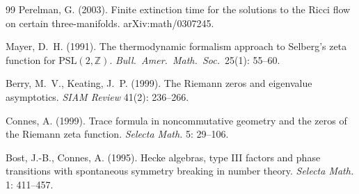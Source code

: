 \documentclass[11pt,a4paper]{article}
\theoremstyle{plain}
\theoremstyle{definition}
\begin{document}
\begin{thebibliography}{99}
Perelman, G. (2003). Finite extinction time for the solutions to
the Ricci flow on certain three-manifolds. arXiv:math/0307245.

Mayer, D.~H. (1991). The thermodynamic formalism approach to
Selberg's zeta function for $\mathrm{PSL}(2, \mathbb{Z})$.
\emph{Bull.\ Amer.\ Math.\ Soc.}\ 25(1): 55--60.

Berry, M.~V., Keating, J.~P. (1999). The Riemann zeros and eigenvalue
asymptotics. \emph{SIAM Review} 41(2): 236--266.

Connes, A. (1999). Trace formula in noncommutative geometry and the
zeros of the Riemann zeta function. \emph{Selecta Math.} 5: 29--106.

Bost, J.-B., Connes, A. (1995). Hecke algebras, type III factors and
phase transitions with spontaneous symmetry breaking in number
theory. \emph{Selecta Math.} 1: 411--457.

\end{thebibliography}
\end{document}
